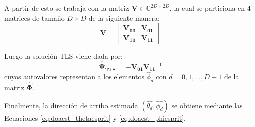 A partir de esto se trabaja con la matriz $\mathbf{V}\in \mathbb{C}^{2D\times 2D}$, la cual se particiona en 4 matrices de tamaño $D \times D$ de la siguiente manera:
\begin{equation}
    \mathbf{V} = \begin{bmatrix}
        \mathbf{V_{00}} & \mathbf{V_{01}} \\
        \mathbf{V_{10}} & \mathbf{V_{11}}
    \end{bmatrix}
    \label{eq:doaest_v_part}
\end{equation}

Luego la solución TLS viene dada por:
\begin{equation}
    \mathbf{\hat{\Psi}_{TLS}}= -\mathbf{V_{01}}\mathbf{V_{11}}^{-1}
    \label{eq:doaest_psi_tls}
\end{equation}
cuyos autovalores representan a los elementos $\hat{\phi}_d$ con $d=0,1,...,D-1$ de la matriz $\mathbf{\hat{\Phi}}$.

Finalmente, la dirección de arribo estimada $(\hat{\theta_d},\hat{\phi_d})$ se obtiene mediante las Ecuaciones \ref{eq:doaest_thetaesprit} y \ref{eq:doaest_phiesprit}.

